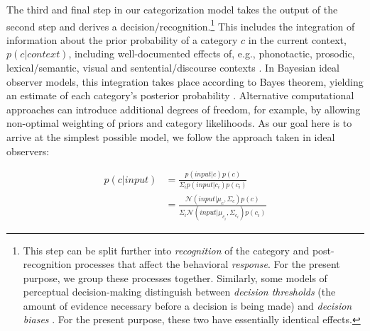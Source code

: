\documentclass[
  11pt,
  man,floatsintext]{apa6}
\begin{document}
The third and final step in our categorization model takes the output of the second step and derives a decision/recognition.\footnote{This step can be split further into \emph{recognition} of the category and post-recognition processes that affect the behavioral \emph{response}. For the present purpose, we group these processes together. Similarly, some models of perceptual decision-making distinguish between \emph{decision thresholds} (the amount of evidence necessary before a decision is being made) and \emph{decision biases} \autocites[stimulus-independent effects on the activation or probability of a response option,][]{clarkedavidson2008,venezia2012}. For the present purpose, these two have essentially identical effects.} This includes the integration of information about the prior probability of a category \(c\) in the current context, \(p(c | context)\), including well-documented effects of, e.g., phonotactic, prosodic, lexical/semantic, visual and sentential/discourse contexts \autocite[for a great concise review, see][]{winn2018}. In Bayesian ideal observer models, this integration takes place according to Bayes theorem, yielding an estimate of each category's posterior probability \autocites[e.g.,][]{luce-pisoni1998,norris-mcqueen2008}. Alternative computational approaches can introduce additional degrees of freedom, for example, by allowing non-optimal weighting of priors and category likelihoods. As our goal here is to arrive at the simplest possible model, we follow the approach taken in ideal observers:

\begin{equation}\label{eq:posterior-probability}
\begin{split}
p(c | input) & = \frac{p(input | c) p(c)}{\Sigma_i p(input | c_i) p(c_i)} \\
                    & = \frac{\mathcal{N}\!(input | \mu_c, \Sigma_c) p(c)}{\Sigma_i \mathcal{N}\!(input | \mu_{c_i}, \Sigma_{c_i}) p(c_i)}
\end{split}
\end{equation}
\end{document}
